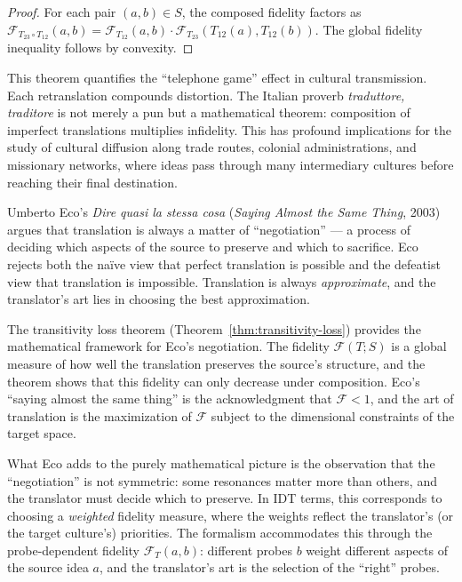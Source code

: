 \begin{proof}
For each pair $(a, b) \in S$, the composed fidelity factors as
$\mathcal{F}_{T_{23} \circ T_{12}}(a, b) = \mathcal{F}_{T_{12}}(a, b)
\cdot \mathcal{F}_{T_{23}}(T_{12}(a), T_{12}(b))$.  The global fidelity
inequality follows by convexity.
\end{proof}

\begin{interpretation}
This theorem quantifies the ``telephone game'' effect in cultural
transmission.  Each retranslation compounds distortion.  The Italian proverb
\emph{traduttore, traditore} is not merely a pun but a mathematical theorem:
composition of imperfect translations multiplies infidelity.  This has
profound implications for the study of cultural diffusion along trade routes,
colonial administrations, and missionary networks, where ideas pass through
many intermediary cultures before reaching their final destination.
\end{interpretation}

\begin{interpretation}
\label{interp:ch18:eco_saying_almost}
Umberto Eco's \textit{Dire quasi la stessa cosa} (\textit{Saying Almost
the Same Thing}, 2003) argues that translation is always a matter of
``negotiation'' --- a process of deciding which aspects of the source to
preserve and which to sacrifice.  Eco rejects both the na\"ive view that
perfect translation is possible and the defeatist view that translation
is impossible.  Translation is always \emph{approximate}, and the
translator's art lies in choosing the best approximation.

The transitivity loss theorem
(Theorem~\ref{thm:transitivity-loss}) provides the mathematical framework
for Eco's negotiation.  The fidelity $\mathcal{F}(T; S)$ is a global
measure of how well the translation preserves the source's structure, and
the theorem shows that this fidelity can only decrease under composition.
Eco's ``saying almost the same thing'' is the acknowledgment that
$\mathcal{F} < 1$, and the art of translation is the maximization of
$\mathcal{F}$ subject to the dimensional constraints of the target space.

What Eco adds to the purely mathematical picture is the observation that
the ``negotiation'' is not symmetric: some resonances matter more than
others, and the translator must decide which to preserve.  In IDT terms,
this corresponds to choosing a \emph{weighted} fidelity measure, where the
weights reflect the translator's (or the target culture's) priorities.
The formalism accommodates this through the probe-dependent fidelity
$\mathcal{F}_T(a,b)$: different probes $b$ weight different aspects of
the source idea $a$, and the translator's art is the selection of the
``right'' probes.
\end{interpretation}

